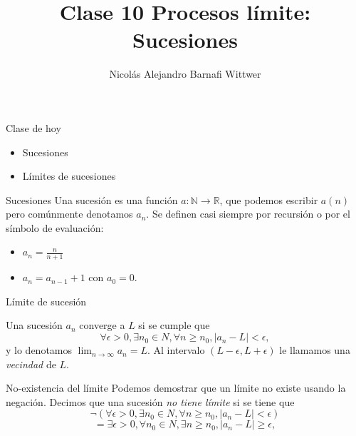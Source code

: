 \documentclass[14pt,aspectratio=169,xcolor=dvipsnames]{beamer}
\title[short title]{Clase 10 Procesos límite: Sucesiones}
\subtitle{}
\author[NA Barnafi] {Nicolás Alejandro Barnafi Wittwer}
\institute[UC|CMM] 
{
    Pontificia Universidad Católica de Chile \\
    Centro de Modelamiento Matemático
}
\date{}
\newcommand{\R}{\mathbb{R}}
\begin{document}
\begin{frame}
    \maketitle
\end{frame}
\begin{frame}{Clase de hoy}
    \begin{itemize}
        \item Sucesiones
        \item Límites de sucesiones
    \end{itemize}

    \vspace{1cm}
\end{frame}
\begin{frame}{Sucesiones}
    Una sucesión es una función $a:\mathbb N\to \R$, que podemos escribir $a(n)$ pero comúnmente denotamos $a_n$. Se definen casi siempre por recursión o por el símbolo de evaluación:
    \begin{itemize}
        \item $a_n = \frac{n}{n+1}$
        \item $a_n = a_{n-1} + 1$ con $a_0 = 0$. 
    \end{itemize}
\end{frame}
\begin{frame}{Límite de sucesión}
    \begin{block}{}
        Una sucesión $a_n$ converge a $L$ si se cumple que
            $$ \forall \epsilon > 0, \exists n_0\in N, \forall n\geq n_0, |a_n - L | < \epsilon, $$
            y lo denotamos $\lim_{n\to\infty} a_n = L$. Al intervalo $(L-\epsilon, L+\epsilon)$ le llamamos una \emph{vecindad} de $L$.
    \end{block}
\end{frame}
\begin{frame}{No-existencia del límite}
    Podemos demostrar que un límite no existe usando la negación. Decimos que una sucesión \emph{no tiene límite} si se tiene que
            $$ \neg(\forall \epsilon > 0, \exists n_0\in N, \forall n\geq n_0, |a_n - L | < \epsilon) $$
            $$ =\exists \epsilon > 0, \forall n_0\in N, \exists n\geq n_0, |a_n - L | \geq \epsilon, $$
\end{frame}
\end{document}
